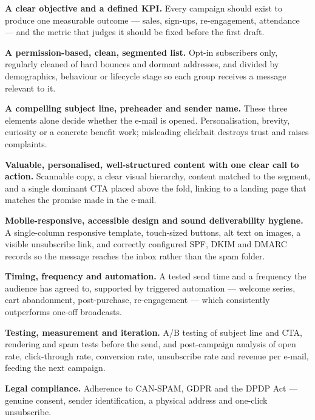 \begin{qlist}
\begin{apts}
\item \textbf{A clear objective and a defined KPI.} Every campaign should exist
      to produce one measurable outcome --- sales, sign-ups, re-engagement,
      attendance --- and the metric that judges it should be fixed before the
      first draft.
\item \textbf{A permission-based, clean, segmented list.} Opt-in subscribers
      only, regularly cleaned of hard bounces and dormant addresses, and
      divided by demographics, behaviour or lifecycle stage so each group
      receives a message relevant to it.
\item \textbf{A compelling subject line, preheader and sender name.} These
      three elements alone decide whether the e-mail is opened. Personalisation,
      brevity, curiosity or a concrete benefit work; misleading clickbait
      destroys trust and raises complaints.
\item \textbf{Valuable, personalised, well-structured content with one clear
      call to action.} Scannable copy, a clear visual hierarchy, content
      matched to the segment, and a single dominant CTA placed above the fold,
      linking to a landing page that matches the promise made in the e-mail.
\item \textbf{Mobile-responsive, accessible design and sound deliverability
      hygiene.} A single-column responsive template, touch-sized buttons, alt
      text on images, a visible unsubscribe link, and correctly configured SPF,
      DKIM and DMARC records so the message reaches the inbox rather than the
      spam folder.
\item \textbf{Timing, frequency and automation.} A tested send time and a
      frequency the audience has agreed to, supported by triggered automation
      --- welcome series, cart abandonment, post-purchase, re-engagement ---
      which consistently outperforms one-off broadcasts.
\item \textbf{Testing, measurement and iteration.} A/B testing of subject line
      and CTA, rendering and spam tests before the send, and post-campaign
      analysis of open rate, click-through rate, conversion rate, unsubscribe
      rate and revenue per e-mail, feeding the next campaign.
\item \textbf{Legal compliance.} Adherence to CAN-SPAM, GDPR and the DPDP Act
      --- genuine consent, sender identification, a physical address and
      one-click unsubscribe.
\end{apts}


\end{qlist}
